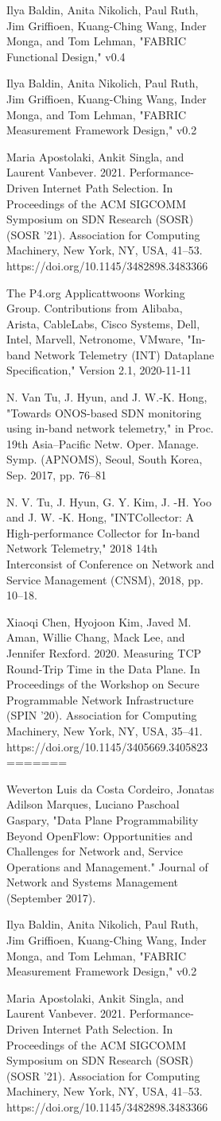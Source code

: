 \documentclass[conference]{IEEEtran}
\begin{document}
\begin{figure}[h!]
\begin{figure}[b]
\begin{figure}[t]
\begin{thebibliography}{00}
         Ilya Baldin, Anita Nikolich, Paul Ruth, Jim Griffioen, Kuang-Ching Wang, Inder Monga, and Tom Lehman, "FABRIC Functional Design," v0.4

         Ilya Baldin, Anita Nikolich, Paul Ruth, Jim Griffioen, Kuang-Ching Wang, Inder Monga, and Tom Lehman, "FABRIC Measurement Framework Design," v0.2

         Maria Apostolaki, Ankit Singla, and Laurent Vanbever. 2021. Performance-Driven Internet Path Selection. In Proceedings of the ACM SIGCOMM Symposium on SDN Research (SOSR) (SOSR '21). Association for Computing Machinery, New York, NY, USA, 41–53. https://doi.org/10.1145/3482898.3483366

         The P4.org Applicattwoons Working Group. Contributions from Alibaba, Arista, CableLabs, Cisco Systems, Dell, Intel, Marvell, Netronome, VMware, "In-band Network Telemetry (INT) Dataplane Specification," Version 2.1, 2020-11-11

         N. Van Tu, J. Hyun, and J. W.-K. Hong, "Towards ONOS-based SDN monitoring using in-band network telemetry," in Proc. 19th Asia–Pacific Netw. Oper. Manage. Symp. (APNOMS), Seoul, South Korea, Sep. 2017, pp. 76–81

         N. V. Tu, J. Hyun, G. Y. Kim, J. -H. Yoo and J. W. -K. Hong, "INTCollector: A High-performance Collector for In-band Network Telemetry," 2018 14th Interconsist of Conference on Network and Service Management (CNSM), 2018, pp. 10–18.

         Xiaoqi Chen, Hyojoon Kim, Javed M. Aman, Willie Chang, Mack Lee, and Jennifer Rexford. 2020. Measuring TCP Round-Trip Time in the Data Plane. In Proceedings of the Workshop on Secure Programmable Network Infrastructure (SPIN '20). Association for Computing Machinery, New York, NY, USA, 35–41. https://doi.org/10.1145/3405669.3405823
=======

         Weverton Luis da Costa Cordeiro, Jonatas Adilson Marques, Luciano Paschoal Gaspary, "Data Plane Programmability Beyond OpenFlow: Opportunities and Challenges for Network and, Service Operations and Management." Journal of Network and Systems Management (September 2017).

         Ilya Baldin, Anita Nikolich, Paul Ruth, Jim Griffioen, Kuang-Ching Wang, Inder Monga, and Tom Lehman, "FABRIC Measurement Framework Design," v0.2

         Maria Apostolaki, Ankit Singla, and Laurent Vanbever. 2021. Performance-Driven Internet Path Selection. In Proceedings of the ACM SIGCOMM Symposium on SDN Research (SOSR) (SOSR '21). Association for Computing Machinery, New York, NY, USA, 41–53. https://doi.org/10.1145/3482898.3483366


\end{thebibliography}
\end{figure}
\end{figure}
\end{figure}
\end{document}
